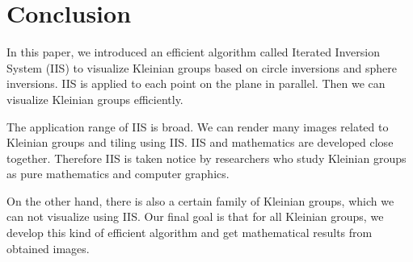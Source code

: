
\section{Conclusion}

In this paper, we introduced an efficient algorithm
called Iterated Inversion System (IIS) to visualize Kleinian
groups based on circle inversions and sphere inversions.
IIS is applied to each point on the plane in parallel.
Then we can visualize Kleinian groups efficiently.

The application range of IIS is broad.
We can render many images related to Kleinian groups and tiling using
IIS.
IIS and mathematics are developed close together.
Therefore IIS is taken notice by researchers who study Kleinian groups as
pure mathematics and computer graphics.

On the other hand, there is also a certain family of Kleinian groups,
which we can not visualize using IIS.
Our final goal is that for all Kleinian groups, we develop this kind of
efficient algorithm and get mathematical results from obtained images.

